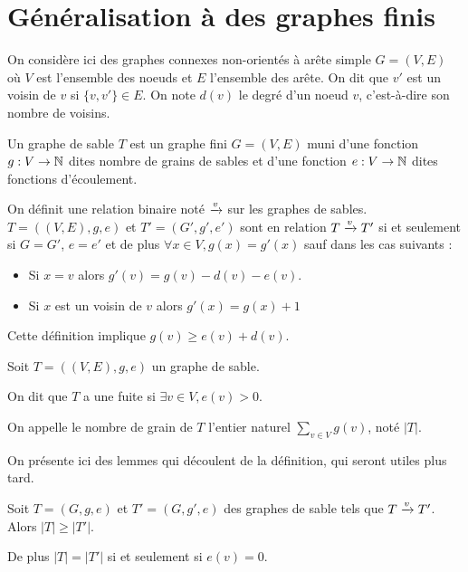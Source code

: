 \section{Généralisation à des graphes finis}
On considère ici des graphes connexes non-orientés à arête simple $G=(V,E)$ où $V$ est l'ensemble des noeuds et $E$ l'ensemble des arête. On dit que $v'$ est un voisin de $v$ si $\{v,v'\}\in E$. On note $d(v)$ le degré d'un noeud $v$, c'est-à-dire son nombre de voisins.

\begin{definition}
Un graphe de sable $T$ est un graphe fini $G=(V,E)$ muni d'une fonction $g:V\rightarrow\mathbb{N}$ dites nombre de grains de sables et d'une fonction $e:V\rightarrow\mathbb{N}$ dites fonctions d'écoulement.
\end{definition}

\begin{definition}
On définit une relation binaire noté $\xrightarrow{v}$ sur les graphes de sables. $T=((V,E),g,e)$ et $T'=(G',g',e')$ sont en relation $T\xrightarrow{v}T'$ si et seulement si $G=G'$, $e=e'$ et de plus $\forall x\in V, g(x)=g'(x)$ sauf dans les cas suivants :
\begin{itemize}
\item Si $x=v$ alors $g'(v)=g(v)-d(v)-e(v)$.
\item Si $x$ est un voisin de $v$ alors $g'(x)=g(x)+1$
\end{itemize}
\end{definition}

\begin{rem}
Cette définition implique $g(v)\geq e(v)+d(v)$.
\end{rem}

\begin{definition}
Soit $T=((V,E),g,e)$ un graphe de sable.

On dit que $T$ a une fuite si $\exists v\in V, e(v)>0$.

On appelle le nombre de grain de  $T$ l'entier naturel $\sum_{v\in V} g(v)$, noté $|T|$.
\end{definition}

On présente ici des lemmes qui découlent de la définition, qui seront utiles plus tard.
\begin{lem}
\label{lemmedecroissancegraph}
Soit $T=(G,g,e)$ et $T'=(G,g',e)$ des graphes de sable tels que $T\xrightarrow{v}T'$. Alors $|T|\geq |T'|$. 

De plus $|T|=|T'|$ si et seulement si $e(v) = 0$.
\end{lem}

